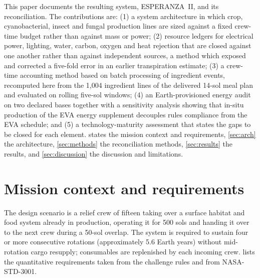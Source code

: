 \documentclass[11pt,a4paper,3p,authoryear]{elsarticle}
\begin{document}
This paper documents the resulting system, ESPERANZA~II, and its reconciliation. The contributions are: (1) a system architecture in which crop, cyanobacterial, insect and fungal production lines are sized against a fixed crew-time budget rather than against mass or power; (2) resource ledgers for electrical power, lighting, water, carbon, oxygen and heat rejection that are closed against one another rather than against independent sources, a method which exposed and corrected a five-fold error in an earlier transpiration estimate; (3) a crew-time accounting method based on batch processing of ingredient events, recomputed here from the 1,004 ingredient lines of the delivered 14-sol meal plan and evaluated on rolling five-sol windows; (4) an Earth-provisioned energy audit on two declared bases together with a sensitivity analysis showing that in-situ production of the EVA energy supplement decouples rules compliance from the EVA schedule; and (5) a technology-maturity assessment that states the gaps to be closed for each element.  states the mission context and requirements, \cref{sec:arch} the architecture, \cref{sec:methods} the reconciliation methods, \cref{sec:results} the results, and \cref{sec:discussion} the discussion and limitations.

\section{Mission context and requirements}\label{sec:mission}

The design scenario is a relief crew of fifteen taking over a surface habitat and food system already in production, operating it for 500 sols and handing it over to the next crew during a 50-sol overlap. The system is required to sustain four or more consecutive rotations (approximately 5.6 Earth years) without mid-rotation cargo resupply; consumables are replenished by each incoming crew.  lists the quantitative requirements taken from the challenge rules and from NASA-STD-3001.
\end{document}
